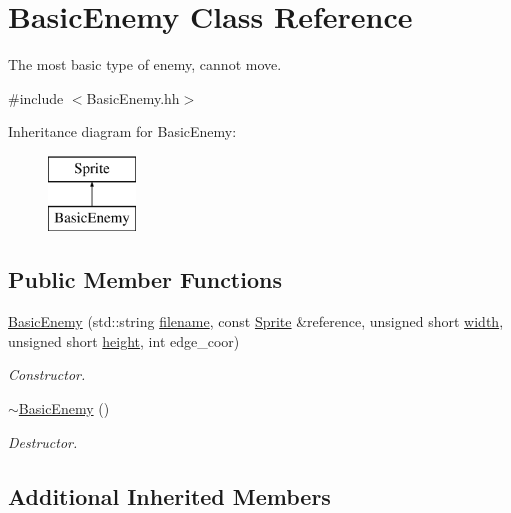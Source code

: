 \hypertarget{classBasicEnemy}{\section{Basic\-Enemy Class Reference}
\label{classBasicEnemy}
}


The most basic type of enemy, cannot move.  




{\ttfamily \#include $<$Basic\-Enemy.\-hh$>$}

Inheritance diagram for Basic\-Enemy\-:\begin{figure}[H]
\begin{center}
\leavevmode
\includegraphics[height=2.000000cm]{classBasicEnemy}
\end{center}
\end{figure}
\subsection*{Public Member Functions}
\begin{DoxyCompactItemize}
\item 
\hyperlink{classBasicEnemy_a1aa4cfb5f78b49b76e2ce99c11aa3cf4}{Basic\-Enemy} (std\-::string \hyperlink{classSprite_aae3514a9a1f77ab5e8e213e44ec618a3}{filename}, const \hyperlink{classSprite}{Sprite} \&reference, unsigned short \hyperlink{classSprite_ac56c9242f797a1a2f76687fca636a3c4}{width}, unsigned short \hyperlink{classSprite_ae96d42c46af7aad1f9031da62f878b21}{height}, int edge\-\_\-coor)
\begin{DoxyCompactList}\small\item\em Constructor. \end{DoxyCompactList}\item 
\hyperlink{classBasicEnemy_afd165e8d0d0ebed94c0ab4a66f8cb2d9}{$\sim$\-Basic\-Enemy} ()
\begin{DoxyCompactList}\small\item\em Destructor. \end{DoxyCompactList}\end{DoxyCompactItemize}
\subsection*{Additional Inherited Members}


